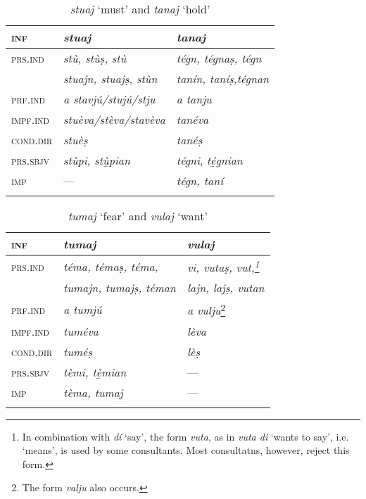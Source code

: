 \begin{table}
	\caption{\textit{stuaj} `must' and \textit{tanaj} `hold'}

	\begin{tabular}{lll}
		\lsptoprule
		\textsc{inf} & \textit{\textbf{stuaj}} & \textbf{\textit{tanaj}}\\
		\midrule
		\textsc{prs.ind} & \textit{stù, stùṣ, stù} & \textit{tégn, tégnaṣ, tégn}\\
		& \textit{stuajn, stuajṣ, stùn} & \textit{tanín, taníṣ,tégnan}\\
		\textsc{prf.ind} & \textit{a stavjú/stujú/stju} & \textit{a tanju}\\
		\textsc{impf.ind} & \textit{stuèva/stèva/stavèva} & \textit{tanéva}\\
		\textsc{cond.dir} & \textit{stuèṣ} & \textit{tanéṣ}\\
		\textsc{prs.sbjv} & \textit{stùpi, stù̱pian} & \textit{tégni}, \textit{té̱gnian}\\
		\textsc{imp} & --- & \textit{tégn, taní}\\
		\lspbottomrule
	\end{tabular}
\end{table}

\begin{table}
	\caption{\textit{tumaj} `fear'  and \textit{vulaj} `want'}

	\begin{tabular}{lll}
		\lsptoprule
		\textsc{inf} & \textit{\textbf{tumaj}} & \textit{\textbf{vulaj}}\\
		\midrule
		\textsc{prs.ind} & \textit{téma, témaṣ, téma,} & \textit{vi, vutaṣ, vut,\footnote{In combination with \textit{dí} `say', the form \textit{vuta}, as in \textit{vuta di} `wants to say', i.e. `means', is used by some consultants. Most consultatns, however, reject this form.}}\\
		& \textit{tumajn, tumajṣ, téman} & \textit{lajn, lajṣ, vutan} \\
		\textsc{prf.ind} & \textit{a tumjú} & \textit{a vulju}\footnote{The form \textit{valju} also occurs.}\\
		\textsc{impf.ind} & \textit{tuméva} & \textit{lèva}\\
		\textsc{cond.dir} & \textit{tuméṣ} & \textit{lèṣ}\\
		\textsc{prs.sbjv} & \textit{tèmi, tè̱mian} & ---\\
		\textsc{imp} & \textit{tèma, tumaj} & ---\\
		\lspbottomrule
	\end{tabular}
\end{table}



